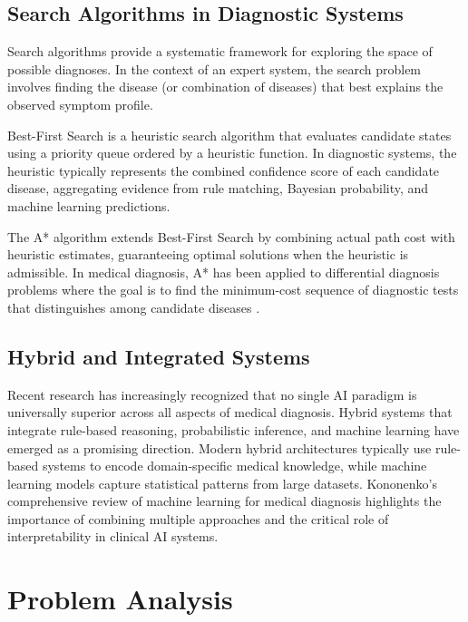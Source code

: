 \documentclass[12pt,a4paper]{article}
\begin{document}
\subsection{Search Algorithms in Diagnostic Systems}

Search algorithms provide a systematic framework for exploring the space of possible diagnoses. In the context of an expert system, the search problem involves finding the disease (or combination of diseases) that best explains the observed symptom profile.

Best-First Search is a heuristic search algorithm that evaluates candidate states using a priority queue ordered by a heuristic function. In diagnostic systems, the heuristic typically represents the combined confidence score of each candidate disease, aggregating evidence from rule matching, Bayesian probability, and machine learning predictions.

The A* algorithm extends Best-First Search by combining actual path cost with heuristic estimates, guaranteeing optimal solutions when the heuristic is admissible. In medical diagnosis, A* has been applied to differential diagnosis problems where the goal is to find the minimum-cost sequence of diagnostic tests that distinguishes among candidate diseases \cite{russell}.

\subsection{Hybrid and Integrated Systems}

Recent research has increasingly recognized that no single AI paradigm is universally superior across all aspects of medical diagnosis. Hybrid systems that integrate rule-based reasoning, probabilistic inference, and machine learning have emerged as a promising direction. Modern hybrid architectures typically use rule-based systems to encode domain-specific medical knowledge, while machine learning models capture statistical patterns from large datasets. Kononenko's comprehensive review \cite{kononenko} of machine learning for medical diagnosis highlights the importance of combining multiple approaches and the critical role of interpretability in clinical AI systems.

\section{Problem Analysis}
\end{document}
